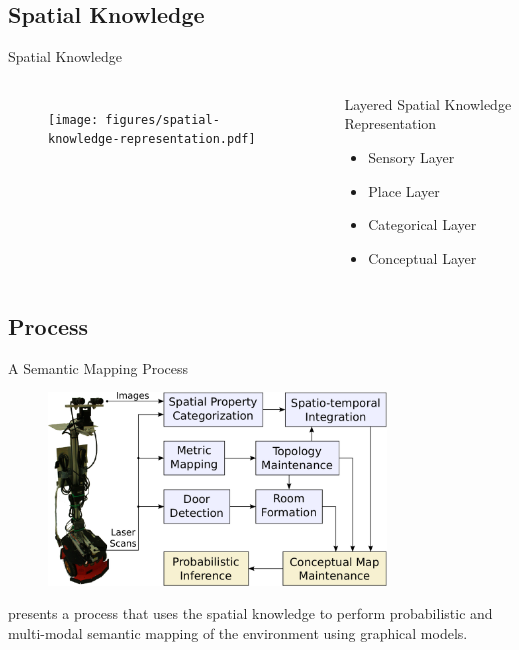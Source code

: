 \documentclass[compress]{beamer}
\begin{document}
\subsection{Spatial Knowledge}
\begin{frame}{Spatial Knowledge}
  \begin{columns}[c]
    \begin{figure}
    \texttt{[image: figures/spatial-knowledge-representation.pdf]}
    \end{figure}

    \begin{block}{Layered Spatial Knowledge Representation~\cite{pronobis2010ias}}
    \begin{itemize}
      \item Sensory Layer
      \item Place Layer
      \item Categorical Layer
      \item Conceptual Layer
    \end{itemize}
    \end{block}
  \end{columns}
\end{frame}

\subsection{Process}
\begin{frame}{A Semantic Mapping Process}
  \begin{figure}
    \includegraphics[width=0.8\textwidth]{figures/dora-architecture.pdf}
  \end{figure}
  \cite{pronobis2011semmap} presents a process that uses the spatial knowledge
  to perform probabilistic and multi-modal semantic mapping of the environment
  using graphical models.
\end{frame}
\end{document}

